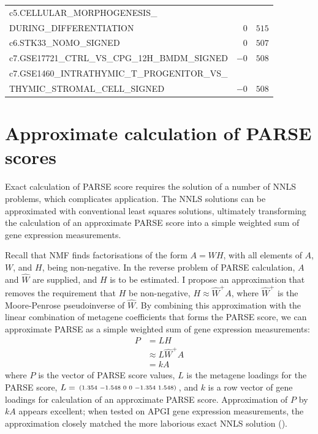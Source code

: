 \begin{longtable}[!htbp]{ l r@{.}l }
\qquad c5.CELLULAR\_MORPHOGENESIS\_                                     \\
\qquad DURING\_DIFFERENTIATION                      & $0$ & $515$       \\
c6.STK33\_NOMO\_SIGNED                              & $0$ & $507$       \\
c7.GSE17721\_CTRL\_VS\_CPG\_12H\_BMDM\_SIGNED       & $-0$ & $508$      \\
c7.GSE1460\_INTRATHYMIC\_T\_PROGENITOR\_VS\_                            \\
\qquad THYMIC\_STROMAL\_CELL\_SIGNED                & $-0$ & $508$      \\ 
\end{longtable}


\chapter{Approximate calculation of \texorpdfstring{\acrshort{PARSE}}{PARSE} scores}
\label{app:sigs-parse-approx}
Exact calculation of \gls{PARSE} score requires the solution of a number of \gls{NNLS} problems, which complicates application.  The \gls{NNLS} solutions can be approximated with conventional least squares solutions, ultimately transforming the calculation of an approximate \gls{PARSE} score into a simple weighted sum of gene expression measurements.

Recall that \gls{NMF} finds factorisations of the form $A = W H$, with all elements of $A$, $W$, and $H$, being non-negative.  In the reverse problem of \gls{PARSE} calculation, $A$ and $\widehat{W}$ are supplied, and $H$ is to be estimated.  I propose an approximation that removes the requirement that $H$ be non-negative, $H \approx \widehat{W}^+ A$, where $\widehat{W}^+$ is the Moore-Penrose pseudoinverse of $\widehat{W}$.  By combining this approximation with the linear combination of metagene coefficients that forms the \gls{PARSE} score, we can approximate \gls{PARSE} as a simple weighted sum of gene expression measurements:
\begin{align}
  P &= L H \\
    &\approx L \widehat{W}^+ A \\
    &= k A
\end{align}
where $P$ is the vector of \gls{PARSE} score values, $L$ is the metagene loadings for the \gls{PARSE} score, $L = \begin{smallmatrix}(1.354&-1.548&0&0&-1.354&1.548)\end{smallmatrix}$, and $k$ is a row vector of gene loadings for calculation of an approximate \gls{PARSE} score.  Approximation of $P$ by $k A$ appears excellent; when tested on \gls{APGI} gene expression measurements, the approximation closely matched the more laborious exact \gls{NNLS} solution ().

